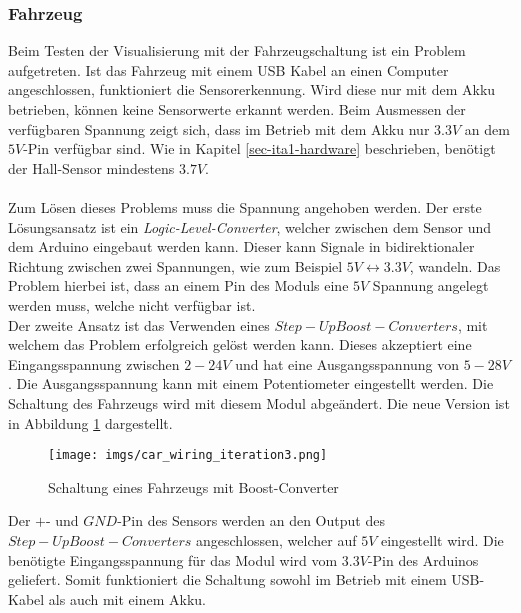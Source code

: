 \documentclass[.../Dokumentation.tex]{subfiles}
\begin{document}
   	\subsubsection*{Fahrzeug}
   	Beim Testen der Visualisierung mit der Fahrzeugschaltung ist ein Problem aufgetreten. Ist das Fahrzeug mit einem USB Kabel an einen Computer angeschlossen, funktioniert die Sensorerkennung. Wird diese nur mit dem Akku betrieben, können keine Sensorwerte erkannt werden. Beim Ausmessen der verfügbaren Spannung zeigt sich, dass im Betrieb mit dem Akku nur $3.3V$ an dem $5V$-Pin verfügbar sind. Wie in Kapitel \ref{sec-ita1-hardware} beschrieben, benötigt der Hall-Sensor mindestens $3.7V$.\\\\
   	Zum Lösen dieses Problems muss die Spannung angehoben werden. Der erste Lösungsansatz ist ein \emph{Logic-Level-Converter}, welcher zwischen dem Sensor und dem Arduino eingebaut werden kann. Dieser kann Signale in bidirektionaler Richtung zwischen zwei Spannungen, wie zum Beispiel $5V \longleftrightarrow 3.3V$, wandeln. Das Problem hierbei ist, dass an einem Pin des Moduls eine $5V$ Spannung angelegt werden muss, welche nicht verfügbar ist.\\
   	Der zweite Ansatz ist das Verwenden eines $Step-Up Boost-Converters$, mit welchem das Problem erfolgreich gelöst werden kann.
   	Dieses akzeptiert eine Eingangsspannung zwischen $2-24V$ und hat eine Ausgangsspannung von $5-28V$. Die Ausgangsspannung kann mit einem Potentiometer eingestellt werden. Die Schaltung des Fahrzeugs wird mit diesem Modul abgeändert. Die neue Version ist in Abbildung \ref{fig-hardware-car-iteration3} dargestellt.
   	\begin{figure}[H]
   		\begin{center}
   			\texttt{[image: imgs/car\_wiring\_iteration3.png]}
   			\caption{Schaltung eines Fahrzeugs mit Boost-Converter}
   			\label{fig-hardware-car-iteration3}
   		\end{center}
   	\end{figure}
   \noindent
   	Der $+$- und $GND$-Pin des Sensors werden an den Output des $Step-Up Boost-Converters$ angeschlossen, welcher auf $5V$ eingestellt wird. Die benötigte Eingangsspannung für das Modul wird vom $3.3V$-Pin des Arduinos geliefert. Somit funktioniert die Schaltung sowohl im Betrieb mit einem USB-Kabel als auch mit einem Akku. 
    
    
\end{document}
